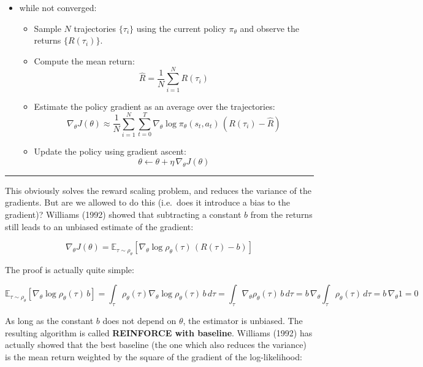 \documentclass[
  letterpaper,
  DIV=11,
  numbers=noendperiod]{scrreprt}
\providecommand{\tightlist}{%
  \setlength{\itemsep}{0pt}\setlength{\parskip}{0pt}}\usepackage{longtable,booktabs,array}
\begin{document}
\begin{itemize}
\item
  while not converged:

  \begin{itemize}
  \tightlist
  \item
    Sample \(N\) trajectories \(\{\tau_i\}\) using the current policy
    \(\pi_\theta\) and observe the returns \(\{R(\tau_i)\}\).
  \item
    Compute the mean return: \[
      \hat{R} = \frac{1}{N} \sum_{i=1}^N R(\tau_i)
      \]
  \item
    Estimate the policy gradient as an average over the trajectories: \[
     \nabla_\theta J(\theta) \approx \frac{1}{N} \sum_{i=1}^N \sum_{t=0}^T \nabla_\theta \log \pi_\theta(s_t, a_t) \, ( R(\tau_i) - \hat{R})
      \]
  \item
    Update the policy using gradient ascent: \[
      \theta \leftarrow \theta + \eta \, \nabla_\theta J(\theta)
      \]
  \end{itemize}
\end{itemize}

\begin{center}\rule{0.5\linewidth}{0.5pt}\end{center}

This obviously solves the reward scaling problem, and reduces the
variance of the gradients. But are we allowed to do this (i.e.~does it
introduce a bias to the gradient)? Williams (1992) showed that
subtracting a constant \(b\) from the returns still leads to an unbiased
estimate of the gradient:

\[
    \nabla_\theta J(\theta) =  \mathbb{E}_{\tau \sim \rho_\theta}[\nabla_\theta \log \rho_\theta (\tau) \, (R(\tau) -b) ]
\]

The proof is actually quite simple:

\[
    \mathbb{E}_{\tau \sim \rho_\theta}[\nabla_\theta \log \rho_\theta (\tau) \, b ] = \int_\tau \rho_\theta (\tau) \nabla_\theta \log \rho_\theta (\tau) \, b \, d\tau = \int_\tau \nabla_\theta  \rho_\theta (\tau) \, b \, d\tau = b \, \nabla_\theta \int_\tau \rho_\theta (\tau) \, d\tau =  b \, \nabla_\theta 1 = 0
\]

As long as the constant \(b\) does not depend on \(\theta\), the
estimator is unbiased. The resulting algorithm is called
\textbf{REINFORCE with baseline}. Williams (1992) has actually showed
that the best baseline (the one which also reduces the variance) is the
mean return weighted by the square of the gradient of the
log-likelihood:
\end{document}
